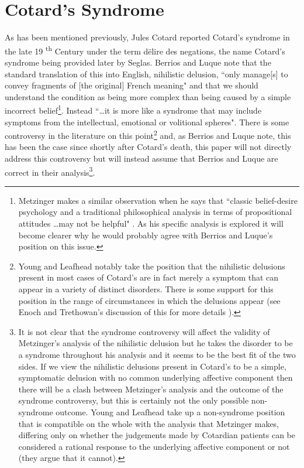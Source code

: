 \chapter{Cotard's Syndrome}
\label{chap:cotards}

As has been mentioned previously, Jules Cotard reported Cotard’s syndrome in the late 19
\textsuperscript{th} Century under the term d\"{e}lire des negations, the name Cotard’s syndrome being provided later by Seglas. Berrios and Luque\cite{berrios1995} note that the standard translation of this into English, nihilistic delusion, ``only manage[s] to convey fragments of [the original] French meaning" and that we should understand the condition as being more complex than being caused by a simple incorrect belief\footnote{Metzinger makes a similar observation when he says that ``classic belief-desire psychology and a traditional philosophical analysis in terms of propositional attitudes \ldots may not be helpful" \cite[p. 458]{metzinger2003}. As his specific analysis is explored it will become clearer why he would probably agree with Berrios and Luque’s position on this issue.}. Instead ``\ldots it is more like a syndrome that may include symptoms from the intellectual, emotional or volitional spheres". There is some controversy in the literature on this point\footnote{Young and Leafhead \cite{young1995} notably take the position that the nihilistic delusions present in most cases of Cotard’s are in fact merely a symptom that can appear in a variety of distinct disorders. There is some support for this position in the range of circumstances in which the delusions appear (see Enoch and Trethowan’s discussion of this for more details \cite{enoch1991}).} and, as Berrios and Luque note, this has been the case since shortly after Cotard’s death, this paper will not directly address this controversy but will instead assume that Berrios and Luque are correct in their analysis\footnote{It is not clear that the syndrome controversy will affect the validity of Metzinger's analysis of the nihilistic delusion but he takes the disorder to be a syndrome throughout his analysis and it seems to be the best fit of the two sides. If we view the nihilistic delusions present in Cotard’s to be a simple, symptomatic delusion with no common underlying affective component then there will be a clash between Metzinger’s analysis and the outcome of the syndrome controversy, but this is certainly not the only possible non-syndrome outcome. Young and Leafhead take up a non-syndrome position that is compatible on the whole with the analysis that Metzinger makes, differing only on whether the judgements made by Cotardian patients can be considered a rational response to the underlying affective component or not (they argue that it cannot).}.

